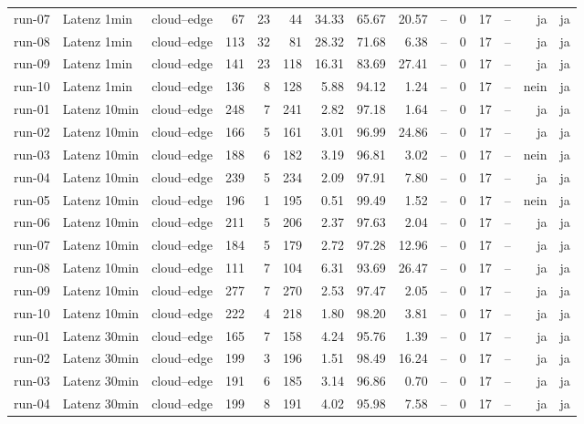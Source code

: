 \begin{table}
{\begin{tabular}{l l p{3.2cm} r r r r r r r r r r r r}
run-07 & Latenz 1min & cloud--edge & 67 & 23 & 44 & 34.33 & 65.67 & 20.57 & -- & 0 & 17 & -- & ja & ja \\
run-08 & Latenz 1min & cloud--edge & 113 & 32 & 81 & 28.32 & 71.68 & 6.38 & -- & 0 & 17 & -- & ja & ja \\
run-09 & Latenz 1min & cloud--edge & 141 & 23 & 118 & 16.31 & 83.69 & 27.41 & -- & 0 & 17 & -- & ja & ja \\
run-10 & Latenz 1min & cloud--edge & 136 & 8 & 128 & 5.88 & 94.12 & 1.24 & -- & 0 & 17 & -- & nein & ja \\
run-01 & Latenz 10min & cloud--edge & 248 & 7 & 241 & 2.82 & 97.18 & 1.64 & -- & 0 & 17 & -- & ja & ja \\
run-02 & Latenz 10min & cloud--edge & 166 & 5 & 161 & 3.01 & 96.99 & 24.86 & -- & 0 & 17 & -- & ja & ja \\
run-03 & Latenz 10min & cloud--edge & 188 & 6 & 182 & 3.19 & 96.81 & 3.02 & -- & 0 & 17 & -- & nein & ja \\
run-04 & Latenz 10min & cloud--edge & 239 & 5 & 234 & 2.09 & 97.91 & 7.80 & -- & 0 & 17 & -- & ja & ja \\
run-05 & Latenz 10min & cloud--edge & 196 & 1 & 195 & 0.51 & 99.49 & 1.52 & -- & 0 & 17 & -- & nein & ja \\
run-06 & Latenz 10min & cloud--edge & 211 & 5 & 206 & 2.37 & 97.63 & 2.04 & -- & 0 & 17 & -- & ja & ja \\
run-07 & Latenz 10min & cloud--edge & 184 & 5 & 179 & 2.72 & 97.28 & 12.96 & -- & 0 & 17 & -- & ja & ja \\
run-08 & Latenz 10min & cloud--edge & 111 & 7 & 104 & 6.31 & 93.69 & 26.47 & -- & 0 & 17 & -- & ja & ja \\
run-09 & Latenz 10min & cloud--edge & 277 & 7 & 270 & 2.53 & 97.47 & 2.05 & -- & 0 & 17 & -- & ja & ja \\
run-10 & Latenz 10min & cloud--edge & 222 & 4 & 218 & 1.80 & 98.20 & 3.81 & -- & 0 & 17 & -- & ja & ja \\
run-01 & Latenz 30min & cloud--edge & 165 & 7 & 158 & 4.24 & 95.76 & 1.39 & -- & 0 & 17 & -- & ja & ja \\
run-02 & Latenz 30min & cloud--edge & 199 & 3 & 196 & 1.51 & 98.49 & 16.24 & -- & 0 & 17 & -- & ja & ja \\
run-03 & Latenz 30min & cloud--edge & 191 & 6 & 185 & 3.14 & 96.86 & 0.70 & -- & 0 & 17 & -- & ja & ja \\
run-04 & Latenz 30min & cloud--edge & 199 & 8 & 191 & 4.02 & 95.98 & 7.58 & -- & 0 & 17 & -- & ja & ja \\

\end{tabular}}
\end{table}
